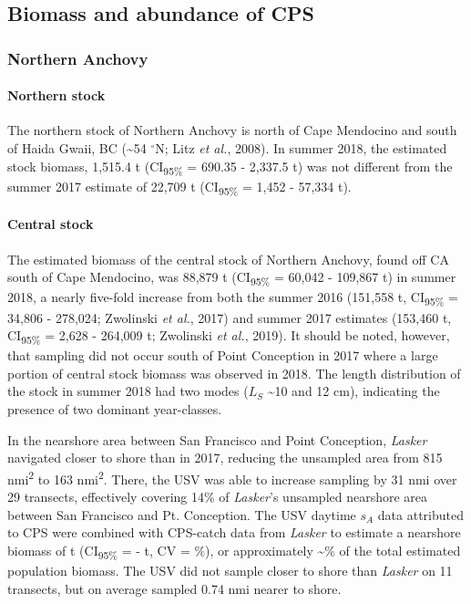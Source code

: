 \documentclass[]{article}
\let\oldparagraph\paragraph
\renewcommand{\paragraph}[1]{\oldparagraph{#1}\mbox{}}
\begin{document}
\hypertarget{biomass-and-abundance-of-cps}{%
\subsection{Biomass and abundance of CPS}\label{biomass-and-abundance-of-cps}}

\hypertarget{discussion-anchovy-biomass}{%
\subsubsection{Northern Anchovy}\label{discussion-anchovy-biomass}}

\hypertarget{discussion-anchovy-biomass-northern}{%
\paragraph{Northern stock}\label{discussion-anchovy-biomass-northern}}

The northern stock of Northern Anchovy is north of Cape Mendocino and south of Haida Gwaii, BC (\textasciitilde54 \(^\circ\)N; Litz \emph{et al.}, 2008). In summer 2018, the estimated stock biomass, 1,515.4 t (CI\textsubscript{95\%} = 690.35 - 2,337.5 t) was not different from the summer 2017 estimate of 22,709 t (CI\textsubscript{95\%} = 1,452 - 57,334 t).

\hypertarget{discussion-anchovy-biomass-central}{%
\paragraph{Central stock}\label{discussion-anchovy-biomass-central}}

The estimated biomass of the central stock of Northern Anchovy, found off CA south of Cape Mendocino, was 88,879 t (CI\textsubscript{95\%} = 60,042 - 109,867 t) in summer 2018, a nearly five-fold increase from both the summer 2016 (151,558 t, CI\textsubscript{95\%} = 34,806 - 278,024; Zwolinski \emph{et al.}, 2017) and summer 2017 estimates (153,460 t, CI\textsubscript{95\%} = 2,628 - 264,009 t; Zwolinski \emph{et al.}, 2019). It should be noted, however, that sampling did not occur south of Point Conception in 2017 where a large portion of central stock biomass was observed in 2018. The length distribution of the stock in summer 2018 had two modes (\(L_S\) \textasciitilde10 and 12 cm), indicating the presence of two dominant year-classes.

In the nearshore area between San Francisco and Point Conception, \emph{Lasker} navigated closer to shore than in 2017, reducing the unsampled area from 815 nmi\textsuperscript{2} to 163 nmi\textsuperscript{2}. There, the USV was able to increase sampling by 31 nmi over 29 transects, effectively covering 14\% of \emph{Lasker}'s unsampled nearshore area between San Francisco and Pt. Conception. The USV daytime \(s_A\) data attributed to CPS were combined with CPS-catch data from \emph{Lasker} to estimate a nearshore biomass of t (CI\textsubscript{95\%} = - t, CV = \%), or approximately \textasciitilde\% of the total estimated population biomass. The USV did not sample closer to shore than \emph{Lasker} on 11 transects, but on average sampled 0.74 nmi nearer to shore.
\end{document}
